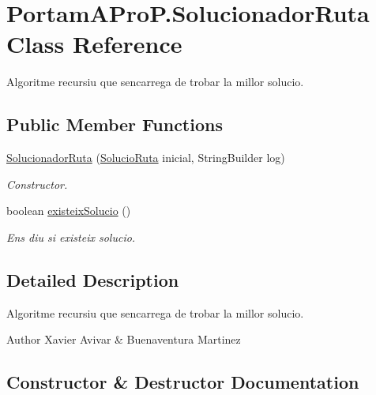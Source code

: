 \hypertarget{class_portam_a_pro_p_1_1_solucionador_ruta}{}\section{Portam\+A\+Pro\+P.\+Solucionador\+Ruta Class Reference}
\label{class_portam_a_pro_p_1_1_solucionador_ruta}


Algoritme recursiu que s\textquotesingle{}encarrega de trobar la millor solucio.  


\subsection*{Public Member Functions}
\begin{DoxyCompactItemize}
\item 
\hyperlink{class_portam_a_pro_p_1_1_solucionador_ruta_a0f24c880819834c47c2c929748319431}{Solucionador\+Ruta} (\hyperlink{class_portam_a_pro_p_1_1_solucio_ruta}{Solucio\+Ruta} inicial, String\+Builder log)
\begin{DoxyCompactList}\small\item\em Constructor. \end{DoxyCompactList}\item 
boolean \hyperlink{class_portam_a_pro_p_1_1_solucionador_ruta_a74732a1383914a52049ee518d1f16460}{existeix\+Solucio} ()
\begin{DoxyCompactList}\small\item\em Ens diu si existeix solucio. \end{DoxyCompactList}\end{DoxyCompactItemize}


\subsection{Detailed Description}
Algoritme recursiu que s\textquotesingle{}encarrega de trobar la millor solucio. 

\begin{DoxyAuthor}{Author}
Xavier Avivar \& Buenaventura Martinez 
\end{DoxyAuthor}


\subsection{Constructor \& Destructor Documentation}
\mbox{\label{class_portam_a_pro_p_1_1_solucionador_ruta_a0f24c880819834c47c2c929748319431}} 

